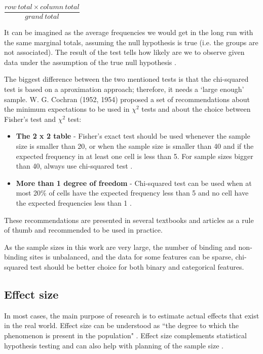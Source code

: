 \vspace{2mm}
\begin{center}
$\dfrac{row\: total\times column\:total}{grand\:total}$
\end{center}

It can be imagined as the average frequencies we would get in the long run with the same marginal totals, assuming the null hypothesis is true (i.e. the groups are not associated). The result of the test tells how likely are we to observe given data under the assumption of the true null hypothesis \cite{bland}.

The biggest difference between the two mentioned tests is that the chi-squared test is based on a aproximation approach; therefore, it needs a `large enough' sample. W. G. Cochran (1952, 1954) proposed a set of recommendations about the minimum expectations to be used in $\chi^{2}$ tests and about the choice between Fisher's test and $\chi^{2}$ test:

\begin{itemize}
\item \textbf{The 2 x 2 table} - Fisher's exact test should be used whenever the sample size is smaller than 20, or when the sample size is smaller than 40 and if the expected frequency in at least one cell is less than 5. For sample sizes bigger than 40, always use chi-squared test \cite{cochran1952, cochran1954}.
\item \textbf{More than 1 degree of freedom} - Chi-squared test can be used when at most 20\% of cells have the expected frequency less than 5 and no cell have the expected frequencies less than 1 \cite{cochran1954}.
\end{itemize}

These recommendations are presented in several textbooks and articles as a rule of thumb \cite{cochranRule} and recommended to be used in practice.

As the sample sizes in this work are very large, the number of binding and non-binding sites is unbalanced, and the data for some features can be sparse, chi-squared test should be better choice for both binary and categorical features.

\subsection{Effect size} \label{s:effectsize}
In most cases, the main purpose of research is to estimate actual effects that exist in the real world. Effect size can be understood as ``the degree to which the phenomenon is present in the population" \cite{cohen_book}. Effect size complements statistical hypothesis testing and can also help with planning of the sample size \cite{cohen}.

